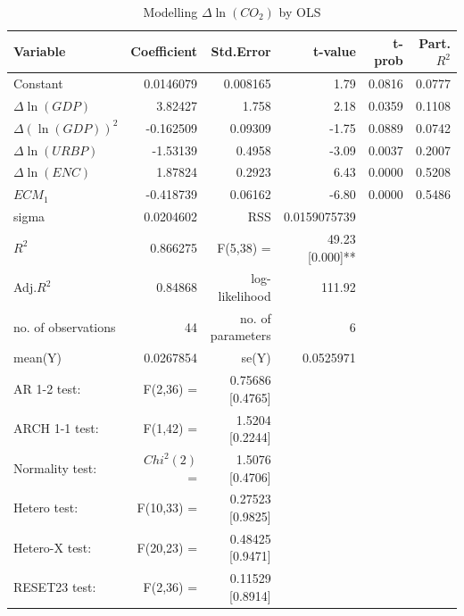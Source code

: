 \documentclass[12pt, a4paper]{article}
\begin{document}
\begin{table}[h]
  \caption{Modelling $\varDelta{\ln{(CO_2)}}$ by OLS}
  \label{tb:model2}
  \centering
  \begin{tabular}{lrrrrr}
    \hline
   Variable    &           Coefficient & Std.Error & t-value &  t-prob  & Part.$R^2$\\
\hline\hline
Constant           &            0.0146079   & 0.008165  &   1.79  & 0.0816 &  0.0777\\
$\varDelta{\ln{(GDP)}}$     &       3.82427   &   1.758  &   2.18 &  0.0359&   0.1108\\
$\varDelta{(\ln{(GDP)})^2}$   &   -0.162509 &   0.09309 &   -1.75 &  0.0889&   0.0742\\
$\varDelta{\ln{(URBP)}}$  &    -1.53139  &   0.4958 &   -3.09 &  0.0037&   0.2007\\
$\varDelta{\ln{(ENC)}}$      &      1.87824  &   0.2923  &   6.43 &  0.0000 &  0.5208\\
$ECM_1$            &              -0.418739 &   0.06162 &   -6.80  & 0.0000 &  0.5486\\
\hline
sigma       &        0.0204602 & RSS    &          0.0159075739&\\
$R^2$      &            0.866275&  F(5,38) =   &  49.23 [0.000]**&\\
Adj.$R^2$     &          0.84868 & log-likelihood     &    111.92&\\
no. of observations &       44 & no. of parameters &          6&\\
mean(Y)         &    0.0267854  &se(Y)    &           0.0525971&\\
\hline
AR 1-2 test:   &   F(2,36)   = & 0.75686 [0.4765]   &&\\
ARCH 1-1 test: &   F(1,42)   =  & 1.5204 [0.2244]  &&\\
Normality test:  & $Chi^2(2)$  =  & 1.5076 [0.4706]  &&\\
Hetero test:    &  F(10,33)  = & 0.27523 [0.9825]  &&\\
Hetero-X test:  &  F(20,23)  = & 0.48425 [0.9471]  &&\\
RESET23 test:   &  F(2,36)   = & 0.11529 [0.8914]  &&\\
    \hline
  \end{tabular}
\end{table}
\end{document}
